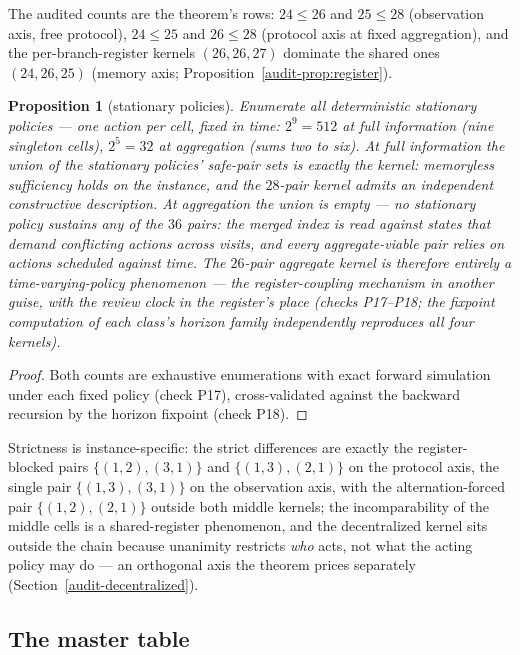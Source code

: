 \documentclass[10pt,twocolumn]{article}
\theoremstyle{plain}
\newtheorem{proposition}[theorem]{Proposition}
\theoremstyle{definition}
\theoremstyle{remark}
\begin{document}
The audited counts are the theorem's rows: \(24 \le 26\) and
\(25 \le 28\) (observation axis, free protocol), \(24 \le 25\) and
\(26 \le 28\) (protocol axis at fixed aggregation), and the
per-branch-register kernels \((26, 26, 27)\) dominate the shared ones
\((24, 26, 25)\) (memory axis; Proposition~\ref{audit-prop:register}).
\begin{proposition}[stationary policies]\label{audit-prop:stationary}
Enumerate all deterministic stationary policies --- one action per cell,
fixed in time: \(2^{9} = 512\) at full information (nine singleton
cells), \(2^{5} = 32\) at aggregation (sums two to six). At full
information the union of the stationary policies' safe-pair sets is
exactly the kernel: memoryless sufficiency holds on the instance, and
the \(28\)-pair kernel admits an independent constructive description.
At aggregation the union is \emph{empty} --- no stationary policy
sustains any of the \(36\) pairs: the merged index is read against
states that demand conflicting actions across visits, and every
aggregate-viable pair relies on actions scheduled against time. The
\(26\)-pair aggregate kernel is therefore entirely a time-varying-policy
phenomenon --- the register-coupling mechanism in another guise, with
the review clock in the register's place (checks P17--P18; the fixpoint
computation of each class's horizon family independently reproduces all
four kernels).
\end{proposition}

\begin{proof}
Both counts are exhaustive enumerations with exact forward simulation
under each fixed policy (check P17), cross-validated against the
backward recursion by the horizon fixpoint (check P18).
\end{proof}

Strictness is instance-specific: the strict differences are exactly the
register-blocked pairs \(\{(1,2),(3,1)\}\) and \(\{(1,3),(2,1)\}\) on
the protocol axis, the single pair \(\{(1,3),(3,1)\}\) on the
observation axis, with the alternation-forced pair \(\{(1,2),(2,1)\}\)
outside both middle kernels; the incomparability of the
middle cells is a shared-register phenomenon, and the decentralized
kernel sits outside the chain because unanimity restricts \emph{who}
acts, not what the acting policy may do --- an orthogonal axis the
theorem prices separately (Section~\ref{audit-decentralized}).

\subsection{The master table}\label{audit-master}
\end{document}
